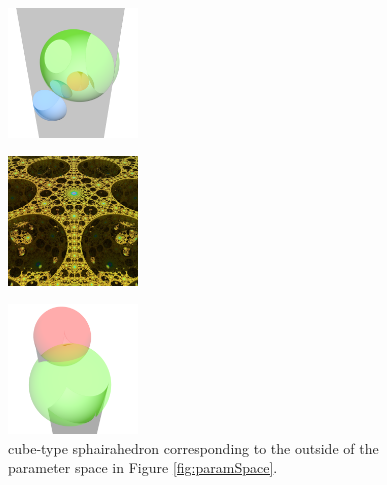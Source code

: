 \begin{figure}[h!tbp]
 \begin{minipage}[t]{0.5\textwidth}
  \begin{minipage}[t]{0.24\textwidth}
   \centering
   \includegraphics[width=1.35in, height=1.35in, keepaspectratio]{./img/application/sphairahedron/breakingIdealityOrRationality/outsidePrism.png}
   \label{fig:hole-sphairahedron}
  \end{minipage}
 \hspace*{\fill}
  \begin{minipage}[t]{0.24\textwidth}
   \centering
   \includegraphics[width=1.35in, height=1.35in, keepaspectratio]{./img/application/sphairahedron/breakingIdealityOrRationality/outsideLimit.jpg}
   \label{fig:intersect-overlap}
  \end{minipage}
  \hspace*{\fill}
  \caption{cube-type sphairahedron corresponding to the outside of the parameter
  space in Figure \ref{fig:paramSpace}.}
  \label{fig:self-intersect}
 \end{minipage}
 \begin{minipage}[t]{0.5\textwidth}
  \begin{minipage}[t]{0.24\textwidth}
   \centering
   \includegraphics[width=1.35in, height=1.35in, keepaspectratio]{./img/application/sphairahedron/breakingIdealityOrRationality/brokenCakePrism.png}

\end{minipage}
\end{minipage}
\end{figure}
